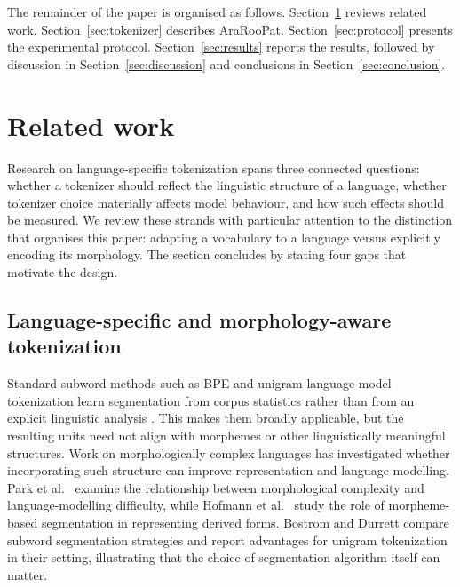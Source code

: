 \documentclass[a4paper,fleqn]{cas-sc}
\begin{document}
The remainder of the paper is organised as follows. Section~\ref{sec:related} reviews related work. Section~\ref{sec:tokenizer} describes AraRooPat. Section~\ref{sec:protocol} presents the experimental protocol. Section~\ref{sec:results} reports the results, followed by discussion in Section~\ref{sec:discussion} and conclusions in Section~\ref{sec:conclusion}.

\section{Related work}
\label{sec:related}

Research on language-specific tokenization spans three connected questions: whether a tokenizer should reflect the linguistic structure of a language, whether tokenizer choice materially affects model behaviour, and how such effects should be measured. We review these strands with particular attention to the distinction that organises this paper: adapting a vocabulary to a language versus explicitly encoding its morphology. The section concludes by stating four gaps that motivate the design.

\subsection{Language-specific and morphology-aware tokenization}
\label{sec:related:morpho}

Standard subword methods such as BPE and unigram language-model tokenization learn segmentation from corpus statistics rather than from an explicit linguistic analysis \citep{sennrich2016neural,kudo2018sentencepiece}. This makes them broadly applicable, but the resulting units need not align with morphemes or other linguistically meaningful structures. Work on morphologically complex languages has investigated whether incorporating such structure can improve representation and language modelling. Park et al.\ \citep{park2021morphology} examine the relationship between morphological complexity and language-modelling difficulty, while Hofmann et al.\ \citep{hofmann2021superbizarre} study the role of morpheme-based segmentation in representing derived forms. Bostrom and Durrett \citep{bostrom2020byte} compare subword segmentation strategies and report advantages for unigram tokenization in their setting, illustrating that the choice of segmentation algorithm itself can matter.
\end{document}
